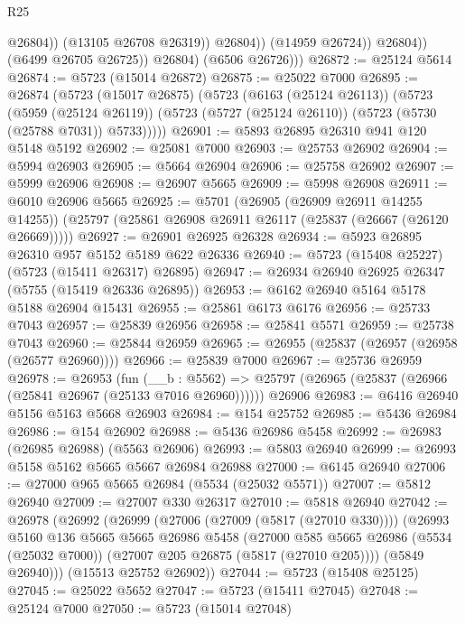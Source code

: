 \begin{lexlean}{R25}
\begin{coremodule}
                            @26804))
                        (@13105 @26708 @26319))
                      @26804))
                  (@14959 @26724))
                @26804))
            (@6499 @26705 @26725))
          @26804)
        (@6506 @26726)))
@26872 := @25124 @5614
@26874 := @5723 (@15014 @26872)
@26875 := @25022 @7000
@26895 := @26874
    (@5723
      (@15017 @26875)
      (@5723
        (@6163 (@25124 @26113))
        (@5723
          (@5959 (@25124 @26119))
          (@5723 (@5727 (@25124 @26110)) (@5723 (@5730 (@25788 @7031)) @5733)))))
@26901 := @5893 @26895 @26310 @941 @120 @5148 @5192
@26902 := @25081 @7000
@26903 := @25753 @26902
@26904 := @5994 @26903
@26905 := @5664 @26904
@26906 := @25758 @26902
@26907 := @5999 @26906
@26908 := @26907 @5665
@26909 := @5998 @26908
@26911 := @6010 @26906 @5665
@26925 := @5701
    (@26905 (@26909 @26911 @14255 @14255))
    (@25797 (@25861 @26908 @26911 @26117 (@25837 (@26667 (@26120 @26669)))))
@26927 := @26901 @26925 @26328
@26934 := @5923 @26895 @26310 @957 @5152 @5189 @622 @26336
@26940 := @5723 (@15408 @25227) (@5723 (@15411 @26317) @26895)
@26947 := @26934 @26940 @26925 @26347 (@5755 (@15419 @26336 @26895))
@26953 := @6162 @26940 @5164 @5178 @5188 @26904 @15431
@26955 := @25861 @6173 @6176
@26956 := @25733 @7043
@26957 := @25839 @26956
@26958 := @25841 @5571
@26959 := @25738 @7043
@26960 := @25844 @26959
@26965 := @26955 (@25837 (@26957 (@26958 (@26577 @26960))))
@26966 := @25839 @7000
@26967 := @25736 @26959
@26978 := @26953
    (fun (__b : @5562) => @25797 (@26965 (@25837 (@26966 (@25841 @26967 (@25133 @7016 @26960))))))
    @26906
@26983 := @6416 @26940 @5156 @5163 @5668 @26903
@26984 := @154 @25752
@26985 := @5436 @26984
@26986 := @154 @26902
@26988 := @5436 @26986 @5458
@26992 := @26983 (@26985 @26988) (@5563 @26906)
@26993 := @5803 @26940
@26999 := @26993 @5158 @5162 @5665 @5667 @26984 @26988
@27000 := @6145 @26940
@27006 := @27000 @965 @5665 @26984 (@5534 (@25032 @5571))
@27007 := @5812 @26940
@27009 := @27007 @330 @26317
@27010 := @5818 @26940
@27042 := @26978
    (@26992
      (@26999
        (@27006 (@27009 (@5817 (@27010 @330))))
        (@26993
          @5160
          @136
          @5665
          @5665
          @26986
          @5458
          (@27000
            @585
            @5665
            @26986
            (@5534 (@25032 @7000))
            (@27007 @205 @26875 (@5817 (@27010 @205))))
          (@5849 @26940)))
      (@15513 @25752 @26902))
@27044 := @5723 (@15408 @25125)
@27045 := @25022 @5652
@27047 := @5723 (@15411 @27045)
@27048 := @25124 @7000
@27050 := @5723 (@15014 @27048)

\end{coremodule}
\end{lexlean}

